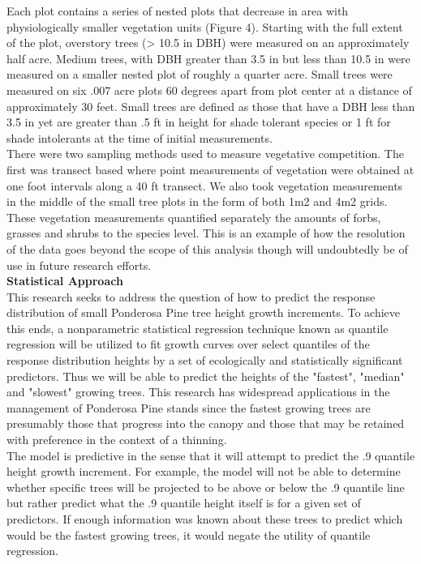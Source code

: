 \documentclass[10pt, letterpaper, fleqn]{article}
\begin{document}
\noindent 
Each plot contains a series of nested plots that decrease in area with physiologically smaller vegetation units (Figure 4). Starting with the full extent of the plot, overstory trees (> 10.5 in DBH) were measured on an approximately half acre. Medium trees, with DBH greater than 3.5 in but less than 10.5 in were measured on a smaller nested plot of roughly a quarter acre.
Small trees were measured on six .007 acre plots 60 degrees apart from plot center at a distance of approximately 30 feet.  Small trees are defined as those that have a DBH less than 3.5 in yet are greater than .5 ft in height for shade tolerant species or 1 ft for shade intolerants at the time of initial measurements.\\[2pt]
\noindent 
There were two sampling methods used to measure vegetative competition. The first was transect based where point measurements of vegetation were obtained at one foot intervals along a 40 ft transect.  We also took vegetation measurements in the middle of the small tree plots in the form of both 1m2 and 4m2 grids. These vegetation measurements quantified separately the amounts of forbs, grasses and shrubs to the species level.  This is an example of how the resolution of the data goes beyond the scope of this analysis though will undoubtedly be of use in future research efforts.\\[2pt]
\noindent 
\textbf{Statistical Approach}\\[1pt]
\noindent 
This research seeks to address the question of how to predict the response distribution of small Ponderosa Pine tree height growth increments.  To achieve this ends, a nonparametric statistical regression technique known as quantile regression will be utilized to fit growth curves over select quantiles of the response distribution heights by a set of ecologically and statistically significant predictors. Thus we will be able to predict the heights of the "fastest", "median" and "slowest" growing trees.
This research has widespread applications in the management of Ponderosa Pine stands since the fastest growing trees are
presumably those that progress into the canopy and those that may be retained with preference in the context of a thinning.\\[2pt]
\noindent 
The model is predictive in the sense that it will attempt to predict the .9 quantile height growth increment. For example, the model will not be able to determine whether specific trees will be projected to be above or below the .9 quantile line but rather predict what the .9 quantile height itself is for a given set of predictors. If enough information was known about these trees to predict which would be the fastest growing trees, it would negate the utility of quantile regression.\\[2pt]
\end{document}

